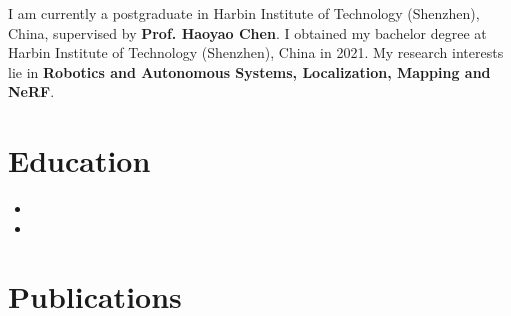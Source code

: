 \documentclass[11pt,a4paper,sans]{moderncv}        %
\begin{document}

\makecvtitle

\small{I am currently a postgraduate in Harbin Institute of Technology (Shenzhen), China, supervised by \textbf{Prof. Haoyao Chen}. I obtained my bachelor degree at Harbin Institute of Technology (Shenzhen), China in 2021. 
My research interests lie in \textbf{Robotics and Autonomous Systems, Localization, Mapping and NeRF}.
} 

\section{Education}


\begin{itemize}


\item{}

\item{}

\end{itemize}



\section{Publications}
\end{document}
